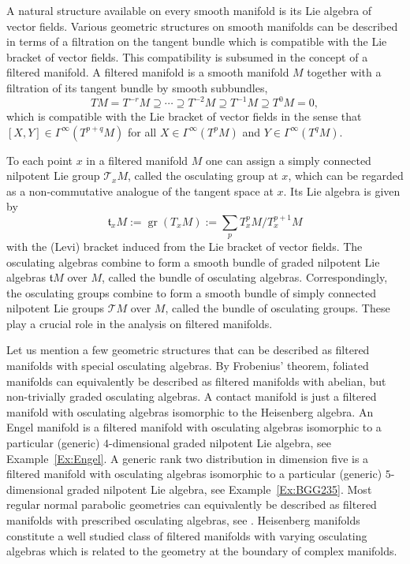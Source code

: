 \documentclass[reqno,12pt]{amsart}
\DeclareMathOperator{\gr}{gr}
\theoremstyle{plain}
\theoremstyle{definition}
\begin{document}
A natural structure available on every smooth manifold is its Lie algebra of vector fields.
Various geometric structures on smooth manifolds can be described in terms of a filtration on the tangent bundle which is compatible with the Lie bracket of vector fields.
This compatibility is subsumed in the concept of a filtered manifold.
A filtered manifold is a smooth manifold $M$ together with a filtration of its tangent bundle by smooth subbundles,
$$
TM=T^{-r}M\supseteq\cdots\supseteq T^{-2}M\supseteq T^{-1}M\supseteq T^0M=0,
$$
which is compatible with the Lie bracket of vector fields in the sense that $[X,Y]\in\Gamma^\infty(T^{p+q}M)$ for all $X\in\Gamma^\infty(T^pM)$ and $Y\in\Gamma^\infty(T^qM)$.


To each point $x$ in a filtered manifold $M$ one can assign a simply connected nilpotent Lie group $\mathcal T_xM$, called the osculating group at $x$, which can be regarded as a non-commutative analogue of the tangent space at $x$.
Its Lie algebra is given by
$$
\mathfrak t_xM:=\gr(T_xM):=\sum_pT_x^pM/T_x^{p+1}M
$$
with the (Levi) bracket induced from the Lie bracket of vector fields.
The osculating algebras combine to form a smooth bundle of graded nilpotent Lie algebras $\mathfrak tM$ over $M$, called the bundle of osculating algebras.
Correspondingly, the osculating groups combine to form a smooth bundle of simply connected nilpotent Lie groups $\mathcal TM$ over $M$, called the bundle of osculating groups. 
These play a crucial role in the analysis on filtered manifolds.


Let us mention a few geometric structures that can be described as filtered manifolds with special osculating algebras.
By Frobenius' theorem, foliated manifolds can equivalently be described as filtered manifolds with abelian, but non-trivially graded osculating algebras.
A contact manifold is just a filtered manifold with osculating algebras isomorphic to the Heisenberg algebra.
An Engel manifold is a filtered manifold with osculating algebras isomorphic to a particular (generic) $4$-dimensional graded nilpotent Lie algebra, see Example~\ref{Ex:Engel}. 
A generic rank two distribution in dimension five \cite{C10} is a filtered manifold with osculating algebras isomorphic to a particular (generic) $5$-dimensional graded nilpotent Lie algebra, see Example~\ref{Ex:BGG235}.
Most regular normal parabolic geometries can equivalently be described as filtered manifolds with prescribed osculating algebras, see \cite[Proposition~4.3.1]{CS09}.
Heisenberg manifolds constitute a well studied \cite{P08} class of filtered manifolds with varying osculating algebras which is related to the geometry at the boundary of complex manifolds.
\end{document}
